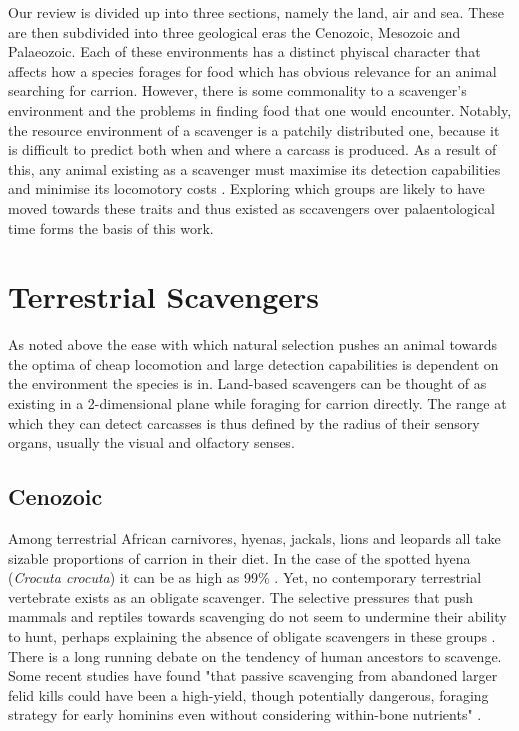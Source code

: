 \documentclass[a4paper,12pt]{article}
\begin{document}
Our review is divided up into three sections, namely the land, air and sea. 
These are then subdivided into three geological eras the Cenozoic, Mesozoic and Palaeozoic. 
Each of these environments has a distinct phyiscal character that affects how a species forages for food which has obvious relevance for an animal searching for carrion.  
However, there is some commonality to a scavenger's environment and the problems in finding food that one would encounter. 
Notably, the resource environment of a scavenger is a patchily distributed one, because it is difficult to predict both when and where a carcass is produced. 
As a result of this, any animal existing as a scavenger must maximise its detection capabilities and minimise its locomotory costs \citep{ruxton2004obligate}.
Exploring which groups are likely to have moved towards these traits and thus existed as sccavengers over palaentological time forms the basis of this work.

\section{Terrestrial Scavengers}
As noted above the ease with which natural selection pushes an animal towards the optima of cheap locomotion and large detection capabilities is dependent on the environment the species is in. 
Land-based scavengers can be thought of as existing in a 2-dimensional plane while foraging for carrion directly. 
The range at which they can detect carcasses is thus defined by the radius of their sensory organs, usually the visual and olfactory senses. 

\subsection*{Cenozoic}
Among terrestrial African carnivores, hyenas, jackals, lions and leopards all take sizable proportions of carrion in their diet.
In the case of the spotted hyena (\textit{Crocuta crocuta}) it can be as high as 99\% \citep{benbow2015introduction}. 
Yet, no contemporary terrestrial vertebrate exists as an obligate scavenger. 
The selective pressures that push mammals and reptiles towards scavenging do not seem to undermine their ability to hunt, perhaps explaining the absence of obligate scavengers in these groups \citep{ruxton2004obligate}.
\\There is a long running debate on the tendency of human ancestors to scavenge. 
Some recent studies have found "that passive scavenging from abandoned larger felid kills could have been a high-yield, though potentially dangerous, foraging strategy for early hominins even without considering within-bone nutrients" \citep{pobiner2015new}. 
\end{document}
